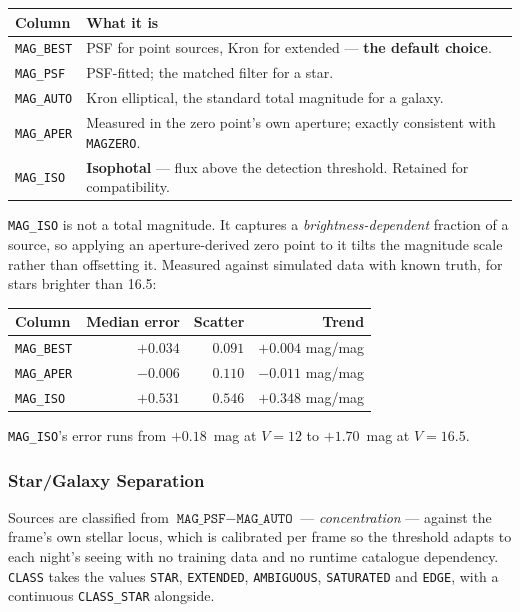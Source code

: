 \documentclass[11pt,a4paper]{article}
\begin{document}
\begin{center}
\begin{tabularx}{\textwidth}{|l|X|}
\hline
\textbf{Column} & \textbf{What it is} \\
\hline
\texttt{MAG\_BEST} & PSF for point sources, Kron for extended --- \textbf{the default choice}. \\
\hline
\texttt{MAG\_PSF} & PSF-fitted; the matched filter for a star. \\
\hline
\texttt{MAG\_AUTO} & Kron elliptical, the standard total magnitude for a galaxy. \\
\hline
\texttt{MAG\_APER} & Measured in the zero point's own aperture; exactly consistent with \texttt{MAGZERO}. \\
\hline
\texttt{MAG\_ISO} & \textbf{Isophotal} --- flux above the detection threshold. Retained for compatibility. \\
\hline
\end{tabularx}
\end{center}

\texttt{MAG\_ISO} is not a total magnitude. It captures a
\emph{brightness-dependent} fraction of a source, so applying an
aperture-derived zero point to it tilts the magnitude scale rather than
offsetting it. Measured against simulated data with known truth, for stars
brighter than 16.5:

\begin{center}
\begin{tabular}{|l|r|r|r|}
\hline
\textbf{Column} & \textbf{Median error} & \textbf{Scatter} & \textbf{Trend} \\
\hline
\texttt{MAG\_BEST} & $+0.034$ & $0.091$ & $+0.004$ mag/mag \\
\hline
\texttt{MAG\_APER} & $-0.006$ & $0.110$ & $-0.011$ mag/mag \\
\hline
\texttt{MAG\_ISO}  & $+0.531$ & $0.546$ & $\mathbf{+0.348}$ mag/mag \\
\hline
\end{tabular}
\end{center}

\texttt{MAG\_ISO}'s error runs from $+0.18$~mag at $V=12$ to $+1.70$~mag at
$V=16.5$.

\subsubsection{Star/Galaxy Separation}
Sources are classified from $\texttt{MAG\_PSF} - \texttt{MAG\_AUTO}$ ---
\emph{concentration} --- against the frame's own stellar locus, which is
calibrated per frame so the threshold adapts to each night's seeing with no
training data and no runtime catalogue dependency. \texttt{CLASS} takes the
values \texttt{STAR}, \texttt{EXTENDED}, \texttt{AMBIGUOUS}, \texttt{SATURATED}
and \texttt{EDGE}, with a continuous \texttt{CLASS\_STAR} alongside.
\end{document}
